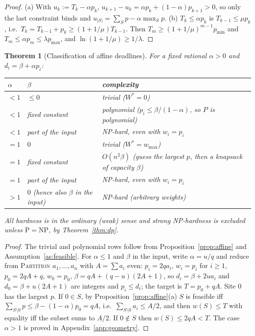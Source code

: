 \documentclass[pdflatex,sn-mathphys-ay]{sn-jnl}
\theoremstyle{thmstyleone}
\newtheorem{theorem}{Theorem}
\theoremstyle{thmstyletwo}
\theoremstyle{thmstylethree}
\begin{document}
\begin{proof}
(a) With $u_k:=T_k-\alpha p_k$, $u_{k+1}-u_k=\alpha p_k+(1-\alpha)p_{k+1}>0$,
so only the last constraint binds and $u_{|S|}=\sum_Sp-\alpha\max_Sp$.
(b) $T_k\le\alpha p_k$ is $T_{k-1}\le\mu p_k$, i.e.\
$T_k=T_{k-1}+p_k\ge(1+1/\mu)T_{k-1}$. Then $T_m\ge(1+1/\mu)^{m-1}p_{\min}$
and $T_m\le\alpha p_m\le\lambda p_{\max}$, and
$\ln(1+1/\mu)\ge1/\lambda$. \end{proof}

\begin{theorem}[Classification of affine deadlines]\label{thm:affine}
For a fixed rational $\alpha>0$ and $d_i=\beta+\alpha p_i$:
\begin{center}\small
\begin{tabular}{@{}llp{}@{}}
\toprule
$\alpha$ & $\beta$ & complexity \\
\midrule
$<1$ & $\le0$ & trivial ($W^\ast=0$) \\
$<1$ & fixed constant & polynomial ($p_i\le\beta/(1-\alpha)$, so $P$ is polynomial) \\
$<1$ & part of the input & NP-hard, even with $w_i=p_i$ \\
$=1$ & $0$ & trivial ($W^\ast=w_{\max}$) \\
$=1$ & fixed constant & $O(n^2\beta)$ (guess the largest $p$, then a knapsack of capacity $\beta$) \\
$=1$ & part of the input & NP-hard, even with $w_i=p_i$ \\
$>1$ & $0$ (hence also $\beta$ in the input) & NP-hard (arbitrary weights) \\
\bottomrule
\end{tabular}
\end{center}
All hardness is in the ordinary (weak) sense and strong NP-hardness is
excluded unless $\mathrm P=\mathrm{NP}$, by Theorem~\ref{thm:dp}.
\end{theorem}

\begin{proof}
The trivial and polynomial rows follow from Proposition~\ref{prop:affine}
and Assumption~\ref{as:feasible}. For $\alpha\le1$ and $\beta$ in the
input, write $\alpha=u/q$ and reduce from \textsc{Partition}
$a_1,\dots,a_n$ with $A=\sum a_i$ even: $p_i=2qa_i$, $w_i=p_i$ for $i\ge1$,
$p_0=2qA+q$, $w_0=p_0$, $\beta=qA+(q-u)(2A+1)$, so $d_i=\beta+2ua_i$ and
$d_0=\beta+u(2A+1)$ are integers and $p_i\le d_i$; the target is
$T=p_0+qA$. Site $0$ has the largest $p$. If $0\in S$, by
Proposition~\ref{prop:affine}(a) $S$ is feasible iff
$\sum_{S\setminus0}p\le\beta-(1-\alpha)p_0=qA$, i.e.\ $\sum_{S\setminus0}a_i\le A/2$,
and then $w(S)\le T$ with equality iff the subset sums to $A/2$. If
$0\notin S$ then $w(S)\le2qA<T$. The case $\alpha>1$ is proved in
Appendix~\ref{app:geometry}. \end{proof}
\end{document}
